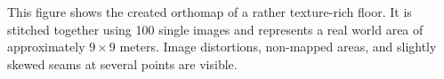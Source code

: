 \label{fig:orthomap}
This figure shows
    the created orthomap of a rather texture-rich floor. It is
    stitched together using 100 single images and represents a
    real world area of approximately $9\times9$ meters. Image
    distortions, non-mapped areas, and slightly skewed seams at
    several points are visible.%